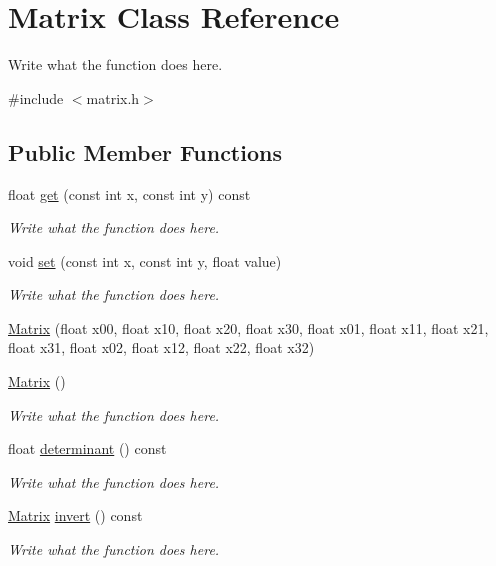 \hypertarget{classMatrix}{\section{Matrix Class Reference}
\label{classMatrix}
}


Write what the function does here.  




{\ttfamily \#include $<$matrix.\+h$>$}

\subsection*{Public Member Functions}
\begin{DoxyCompactItemize}
\item 
float \hyperlink{classMatrix_a44c5cb86dbd3b1cceb4fb97f8a7162cf}{get} (const int x, const int y) const 
\begin{DoxyCompactList}\small\item\em Write what the function does here. \end{DoxyCompactList}\item 
void \hyperlink{classMatrix_afed63f439c03991f045224143dfea6bf}{set} (const int x, const int y, float value)
\begin{DoxyCompactList}\small\item\em Write what the function does here. \end{DoxyCompactList}\item 
\hyperlink{classMatrix_a795649d936f1eb2768d4a32f45c35c61}{Matrix} (float x00, float x10, float x20, float x30, float x01, float x11, float x21, float x31, float x02, float x12, float x22, float x32)
\item 
\hyperlink{classMatrix_a2dba13c45127354c9f75ef576f49269b}{Matrix} ()
\begin{DoxyCompactList}\small\item\em Write what the function does here. \end{DoxyCompactList}\item 
float \hyperlink{classMatrix_aadfa353962ca1bf43ed148d79cc71fc6}{determinant} () const 
\begin{DoxyCompactList}\small\item\em Write what the function does here. \end{DoxyCompactList}\item 
\hyperlink{classMatrix}{Matrix} \hyperlink{classMatrix_acaac7c3eb8f32224c07dcd620ca44e26}{invert} () const 
\begin{DoxyCompactList}\small\item\em Write what the function does here. \end{DoxyCompactList}\item 

\end{DoxyCompactItemize}
